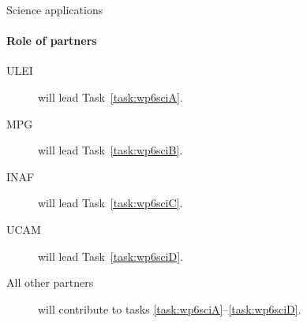 \begin{workpackage}{Science applications}
\begin{wpdescription}
    \paragraph{Role of partners}
    \begin{description}
      \item[ULEI] will lead Task~\ref{task:wp6sciA}.
      \item[MPG] will lead Task~\ref{task:wp6sciB}.
      \item[INAF] will lead Task~\ref{task:wp6sciC}.
      \item[UCAM] will lead Task~\ref{task:wp6sciD}.
      \item[All other partners] will contribute to tasks \ref{task:wp6sciA}--\ref{task:wp6sciD}.
    \end{description}
  \end{wpdescription}

  \begin{wpdeliverables}
  \end{wpdeliverables}

\end{workpackage}


